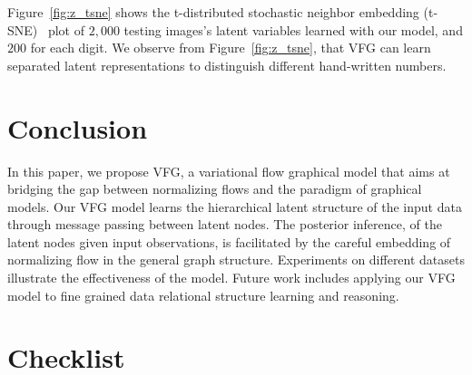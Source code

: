 \documentclass{article}
\begin{document}
Figure~\ref{fig:z_tsne} shows the t-distributed stochastic neighbor embedding (t-SNE)~\cite{maaten2008visualizing} plot of $2,000$ testing images's latent variables learned with our model, and $200$ for each digit. 
We observe from Figure~\ref{fig:z_tsne}, that VFG can learn separated latent representations to distinguish different hand-written numbers.

\vspace{-0.1in}
\section{Conclusion}\label{sec:conclusion}
\vspace{-0.05in}
In this paper, we propose VFG, a variational flow graphical model that aims at bridging the gap between normalizing flows and the paradigm of graphical models.
Our VFG model learns the hierarchical latent structure of the input data through message passing between latent nodes.
The posterior inference, of the latent nodes given input observations, is facilitated by the careful embedding of normalizing flow in the general graph structure.
Experiments on different datasets illustrate the effectiveness of the model. 
Future work includes applying our VFG model to fine grained data relational structure learning and reasoning. 





\section*{Checklist}

\end{document}

